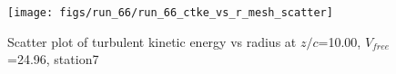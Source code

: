 \begin{figure}[H]
\centering
\texttt{[image: figs/run\_66/run\_66\_ctke\_vs\_r\_mesh\_scatter]}
\caption{Scatter plot of turbulent kinetic energy vs radius at $z/c$=10.00, $V_{free}$=24.96, station7}
\label{fig:run_66_ctke_vs_r_mesh_scatter}
\end{figure}


